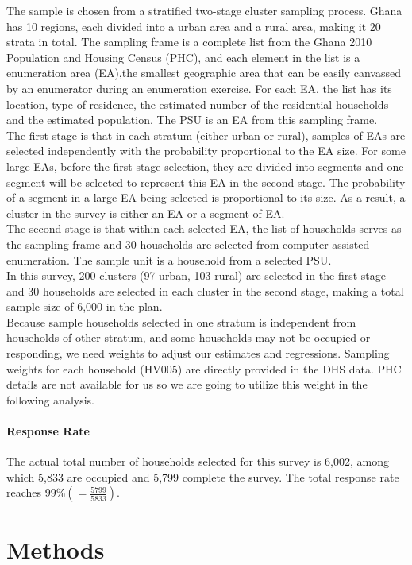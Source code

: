 \documentclass[11pt]{article}
\begin{document}
The sample is chosen from a stratified two-stage cluster sampling process. Ghana has 10 regions, each divided into a urban area and a rural area, making it 20 strata in total. The sampling frame is a complete list from the Ghana 2010 Population and Housing Census (PHC), and each element in the list is a enumeration area (EA),the smallest geographic area that can be easily canvassed by an enumerator during an enumeration exercise. For each EA, the list has its location, type of residence, the estimated number of the residential households and the estimated population. The PSU is an EA from this sampling frame.  \\
The first stage is that in each stratum (either urban or rural), samples of EAs are selected independently with the probability proportional to the EA size. For some large EAs, before the first stage selection, they are divided into segments and one segment will be selected to represent this EA in the second stage. The probability of a segment in a large EA being selected is proportional to its size. As a result, a cluster in the survey is either an EA or a segment of EA. \\
The second stage is that within each selected EA, the list of households serves as the sampling frame and 30 households are selected from computer-assisted enumeration. The sample unit is a household from a selected PSU.  \\
In this survey, 200 clusters (97 urban, 103 rural) are selected in the first stage and 30 households are selected in each cluster in the second stage, making a total sample size of 6,000 in the plan. \\
Because sample households selected in one stratum is independent from households of other stratum, and some households may not be occupied or responding, we need weights to adjust our estimates and regressions. Sampling weights for each household (HV005) are directly provided in the DHS data. PHC details are not available for us so we are going to utilize this weight in the following analysis.

\paragraph{Response Rate} The actual total number of households selected for this survey is 6,002, among which 5,833 are occupied and 5,799 complete the survey. The total response rate reaches $99\% (=\frac{5799}{5833})$. 

\section{Methods}
\end{document}
